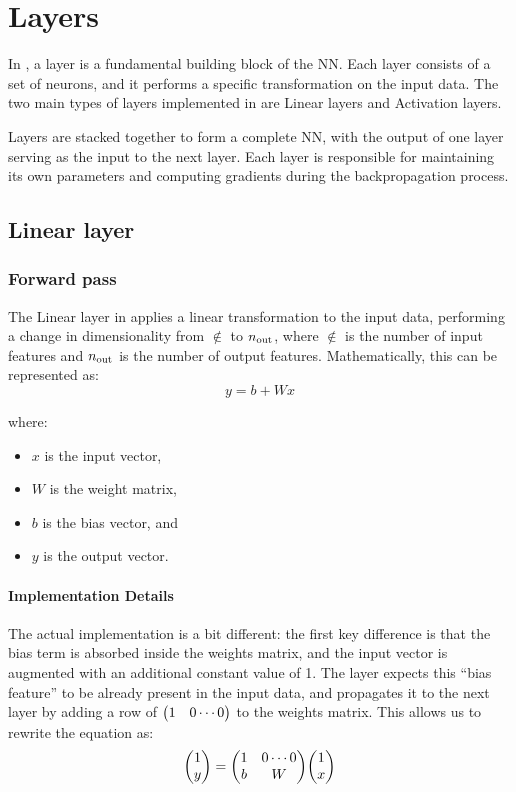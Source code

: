 \section{Layers} \label{sec:layer}

In \mfnet, a layer is a fundamental building block of the \acl{NN}. Each layer consists of a set of neurons, and it performs a specific transformation on the input data. The two main types of layers implemented in \mfnet are Linear layers and Activation layers.

Layers are stacked together to form a complete \acl{NN}, with the output of one layer serving as the input to the next layer.  Each layer is responsible for maintaining its own parameters and computing gradients during the backpropagation process.

\subsection{Linear layer}
\subsubsection{Forward pass}
The Linear layer in \mfnet applies a linear transformation to the input data, performing a change in dimensionality from $\nin$ to $n_\text{out}$, where $\nin$ is the number of input features and $n_\text{out}$ is the number of output features. Mathematically, this can be represented as:
\begin{equation*}
    y = b + Wx
\end{equation*}

where:
\begin{itemize}
    \item $x$ is the  input vector,
    \item $W$ is the \shape{\nout}{\nin} weight matrix,
    \item $b$ is the  bias vector, and
    \item $y$ is the  output vector.
\end{itemize}

\paragraph{Implementation Details} The actual implementation is a bit different: the first key difference is that the bias term is absorbed inside the weights matrix, and the input vector is augmented with an additional constant value of 1. The layer expects this ``bias feature'' to be already present in the input data, and propagates it to the next layer by adding a row of $\mqty(1 & 0 \cdots 0)$ to the weights matrix. This allows us to rewrite the equation as:
\begin{equation*}
    \mqty( 1 \\ y ) = \mqty( 1 & 0 \cdots 0 \\ b & W ) \mqty( 1 \\ x )
\end{equation*}

